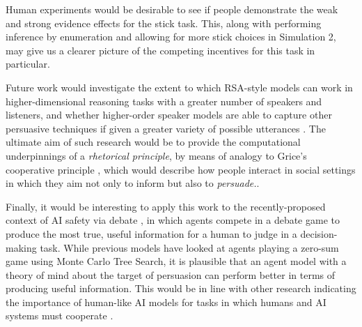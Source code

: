 \documentclass[10pt,letterpaper]{article}
\begin{document}
Human experiments would be desirable to see if people demonstrate the weak and strong evidence effects for the stick task.
This, along with performing inference by enumeration and allowing for more stick choices in Simulation 2, may give us a clearer
picture of the competing incentives for this task in particular.

Future work would investigate the extent to which RSA-style models can work in higher-dimensional reasoning tasks with
a greater number of speakers and listeners,
and whether higher-order speaker models are able to capture other persuasive techniques if given a greater variety of
possible utterances \cite{cialdini1993influence, falk_persuasion_2018}. The ultimate aim of such research would be to
provide the computational underpinnings of a \textit{rhetorical principle}, by means of analogy to Grice's cooperative 
principle \cite{grice_logic_1975}, which would describe how people interact in social settings in which they aim not
only to inform but also to \textit{persuade.}.

Finally, it would be interesting to apply this work to the recently-proposed context of AI safety via debate \cite{irving_ai_2018}, in which
agents compete in a debate game to produce the most true, useful information for a human to judge in a decision-making
task. While previous models have looked at agents playing a zero-sum game using Monte Carlo Tree Search, it is 
plausible that an agent model with a theory of mind about the target of persuasion can perform better in terms of producing
useful information. This would be in line with other research indicating the importance of human-like AI models for tasks in which
humans and AI systems must cooperate \cite{carroll2019utility, hilgard_learning_2019}.


\nocite{lawson-tancred_art_1991}



\setlength{\bibleftmargin}{.125in}
\setlength{\bibindent}{-\bibleftmargin}


\end{document}

